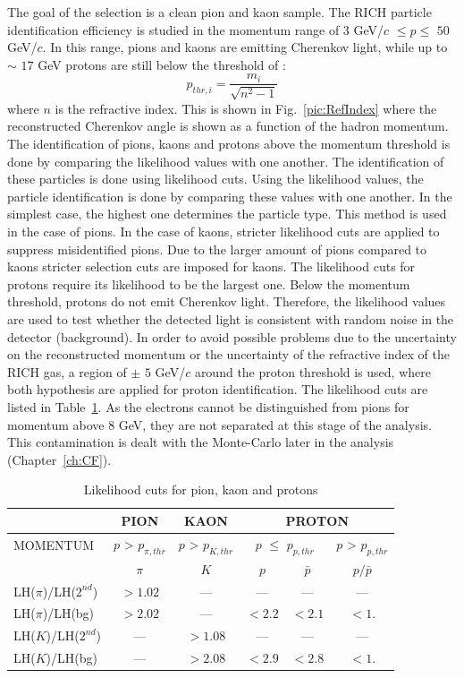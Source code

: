 The goal of the selection is a clean pion and kaon sample. The RICH particle identification efficiency is studied in the momentum range of $3$ GeV/$c$ $ \leq p \leq $ $50$ GeV/$c$. In this range, pions and kaons are emitting Cherenkov light, while up to $\sim$ $17$ GeV protons are still below the threshold of :
%
\begin{equation}
  p_{thr,i} = \frac{m_i}{ \sqrt{n^{2}-1} }
\end{equation}
%
where $n$ is the refractive index. This is shown in Fig.~\ref{pic:RefIndex} where the reconstructed Cherenkov angle is shown as a function of the hadron momentum. The identification of pions, kaons and protons above the momentum threshold is done by comparing the likelihood values with one another. The identification of these particles is done using likelihood cuts. Using the likelihood values, the particle identification is done by comparing these values with one another. In the simplest case, the highest one determines the particle type. This method is used in the case of pions. In the case of kaons, stricter likelihood cuts are applied to suppress misidentified pions. Due to the larger amount of pions compared to kaons stricter selection cuts are imposed for kaons. The likelihood cuts for protons require its likelihood to be the largest one.  Below the momentum threshold, protons do not emit Cherenkov light. Therefore, the likelihood values are used to test whether the detected light is consistent with random noise in the detector (background). In order to avoid possible problems due to the uncertainty on the reconstructed momentum or the uncertainty of the refractive index of the RICH gas, a region of $\pm$ $5$ GeV/$c$ around the proton threshold is used, where both hypothesis are applied for proton identification. The likelihood cuts are listed in Table~\ref{tab:LHcut}. As the electrons cannot be distinguished from pions for momentum above $8$ GeV, they are not separated at this stage of the analysis. This contamination is dealt with the Monte-Carlo later in the analysis (Chapter~\ref{ch:CF}).

\begin{table}[!h]
  \caption{Likelihood cuts for pion, kaon and protons}
  \label{tab:LHcut}
  \centering
  \begin{tabular}{lccccc}
    \hline
     & PION & KAON & \multicolumn{3}{c}{PROTON} \\
    \hline
    MOMENTUM & $p$ > $p_{\pi,thr}$ & $p$ > $p_{K,thr}$ & \multicolumn{2}{c}{$p$ $\leq$ $p_{p,thr}$} & $p$ > $p_{p,thr}$ \\
     & $\pi$ & $K$ & $p$ & $\bar{p}$ & $p/\bar{p}$ \\
    LH($\pi$)/LH($2^{nd}$) & $> 1.02$ & --- & --- & --- & --- \\
    LH($\pi$)/LH(bg) & $> 2.02$ & --- & $< 2.2$ & $< 2.1$ & $< 1.$\\
    LH($K$)/LH($2^{nd}$) & --- & $> 1.08$ & --- & --- & --- \\
    LH($K$)/LH(bg) & --- & $> 2.08$ & $< 2.9$ & $< 2.8$ & $< 1.$ \\
    \hline
  \end{tabular}
\end{table}

